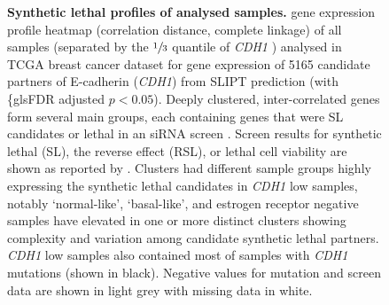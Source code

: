 \begin{figure}[!ht]
  \centering
    \caption[Synthetic lethal  profiles of analysed samples]{\small \textbf{Synthetic lethal  profiles of analysed samples.} \Gls{gene expression} profile heatmap (correlation distance, complete linkage) of all samples (separated by the $\sfrac{1}{3}$ quantile of \textit{CDH1} ) analysed in \gls{TCGA} breast cancer dataset for \gls{gene expression} of 5165 candidate partners of \gls{E-cadherin} (\textit{CDH1}) from \gls{SLIPT} prediction (with \{gls{FDR} adjusted $p < 0.05$). Deeply clustered, inter-correlated genes form several main groups, each containing genes that were SL candidates or lethal in an \gls{siRNA} screen \citep{Telford2015}. Screen results for \gls{synthetic lethal} (SL), the reverse effect (RSL), or lethal cell viability are shown as reported by \citet{Telford2015}. Clusters had different sample groups highly expressing the \gls{synthetic lethal} candidates in \textit{CDH1} low samples, notably `normal-like', `basal-like', and estrogen receptor negative samples have elevated  in one or more distinct clusters showing complexity and variation among candidate \gls{synthetic lethal} partners. \textit{CDH1} low samples also contained most of samples with \textit{CDH1} \glspl{mutation} (shown in black). Negative values for \gls{mutation} and screen data are shown in light grey with missing data in white.
}
\label{fig:slipt_expr}
\end{figure}


